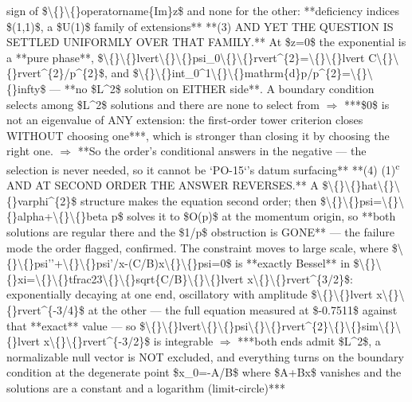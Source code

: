 \begin{description}
sign of \$\textbackslash\{\}\textbackslash\{\}operatorname\{Im\}z\$ and none for the other: **deficiency indices \$(1,1)\$, a \$U(1)\$ family of extensions**  **(3) AND YET THE QUESTION IS SETTLED UNIFORMLY OVER THAT FAMILY.** At \$z=0\$ the exponential is a **pure phase**, \$\textbackslash\{\}\textbackslash\{\}lvert\textbackslash\{\}\textbackslash\{\}psi\_0\textbackslash\{\}\textbackslash\{\}rvert\textasciicircum{}\{2\}=\textbackslash\{\}\textbackslash\{\}lvert C\textbackslash\{\}\textbackslash\{\}rvert\textasciicircum{}\{2\}/p\textasciicircum{}\{2\}\$, and \$\textbackslash\{\}\textbackslash\{\}int\_0\textasciicircum{}1\textbackslash\{\}\textbackslash\{\}mathrm\{d\}p/p\textasciicircum{}\{2\}=\textbackslash\{\}\textbackslash\{\}infty\$ --- **no \$L\textasciicircum{}2\$ solution on EITHER side**. A boundary condition selects among \$L\textasciicircum{}2\$ solutions and there are none to select from \ensuremath{\Rightarrow} ***\$0\$ is not an eigenvalue of ANY extension: the first-order tower criterion closes WITHOUT choosing one***, which is stronger than closing it by choosing the right one. \ensuremath{\Rightarrow} **So the order's conditional answers in the negative --- the selection is never needed, so it cannot be `PO-15`'s datum surfacing**  **(4) (1)\textsuperscript{c} AND AT SECOND ORDER THE ANSWER REVERSES.** A \$\textbackslash\{\}\textbackslash\{\}hat\textbackslash\{\}\textbackslash\{\}varphi\textasciicircum{}\{2\}\$ structure makes the equation second order; then \$\textbackslash\{\}\textbackslash\{\}psi=\textbackslash\{\}\textbackslash\{\}alpha+\textbackslash\{\}\textbackslash\{\}beta p\$ solves it to \$O(p)\$ at the momentum origin, so **both solutions are regular there and the \$1/p\$ obstruction is GONE** --- the failure mode the order flagged, confirmed. The constraint moves to large scale, where \$\textbackslash\{\}\textbackslash\{\}psi''+\textbackslash\{\}\textbackslash\{\}psi'/x-(C/B)x\textbackslash\{\}\textbackslash\{\}psi=0\$ is **exactly Bessel** in \$\textbackslash\{\}\textbackslash\{\}xi=\textbackslash\{\}\textbackslash\{\}tfrac23\textbackslash\{\}\textbackslash\{\}sqrt\{C/B\}\textbackslash\{\}\textbackslash\{\}lvert x\textbackslash\{\}\textbackslash\{\}rvert\textasciicircum{}\{3/2\}\$: exponentially decaying at one end, oscillatory with amplitude \$\textbackslash\{\}\textbackslash\{\}lvert x\textbackslash\{\}\textbackslash\{\}rvert\textasciicircum{}\{-3/4\}\$ at the other --- the full equation measured at \$-0.7511\$ against that **exact** value --- so \$\textbackslash\{\}\textbackslash\{\}lvert\textbackslash\{\}\textbackslash\{\}psi\textbackslash\{\}\textbackslash\{\}rvert\textasciicircum{}\{2\}\textbackslash\{\}\textbackslash\{\}sim\textbackslash\{\}\textbackslash\{\}lvert x\textbackslash\{\}\textbackslash\{\}rvert\textasciicircum{}\{-3/2\}\$ is integrable \ensuremath{\Rightarrow} ***both ends admit \$L\textasciicircum{}2\$, a normalizable null vector is NOT excluded, and everything turns on the boundary condition at the degenerate point \$x\_0=-A/B\$ where \$A+Bx\$ vanishes and the solutions are a constant and a logarithm (limit-circle)***

\end{description}

